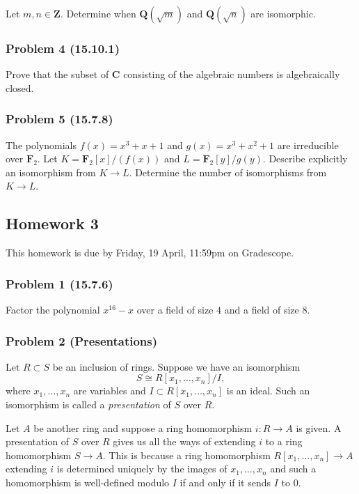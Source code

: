 \documentclass[11pt]{article}
\begin{document}
\bigskip

Let \(m, n \in \mathbf{Z}\).
Determine when \(\mathbf{Q}(\sqrt m)\) and \(\mathbf{Q}(\sqrt n)\) are isomorphic.
\subsubsection{Problem 4 (15.10.1)}
\label{sec:orgb454768}

Prove that the subset of \(\mathbf{C}\) consisting of the algebraic numbers is algebraically closed.
\subsubsection{Problem 5 (15.7.8)}
\label{sec:org962ef5e}

The polynomials \(f(x) = x^3 + x + 1\) and \(g(x) = x^3 + x^2 + 1\) are irreducible over \(\mathbf{F}_2\).
Let \(K = \mathbf{F}_2[x]/(f(x))\) and \(L = \mathbf{F}_2[y]/g(y)\).
Describe explicitly an isomorphism from \(K \to L\).
Determine the number of isomorphisms from \(K \to L\).
\subsection{Homework 3}
\label{sec:orgf5921ab}
This homework is due by Friday, 19 April, 11:59pm on Gradescope.
\subsubsection{Problem 1 (15.7.6)}
\label{sec:org82d0910}

Factor the polynomial \(x^{16}-x\) over a field of size \(4\) and a field of size \(8\).
\subsubsection{Problem 2 (Presentations)}
\label{sec:org529d139}

Let \(R \subset S\) be an inclusion of rings.
Suppose we have an isomorphism
\[ S \cong R[x_1, \dots, x_n]/I, \]
where \(x_1, \dots, x_n\) are variables and \(I \subset R[x_1, \dots, x_n]\) is an ideal.
Such an isomorphism is called a \emph{presentation} of \(S\) over \(R\).

Let \(A\) be another ring and suppose a ring homomorphism \(i \colon R \to A\) is given.
A presentation of \(S\) over \(R\) gives us all the ways of extending \(i\) to a ring homomorphism \(S \to A\).
This is because a ring homomorphism \(R[x_1,\dots,x_n] \to A\) extending \(i\) is determined uniquely by the images of \(x_1, \dots, x_n\) and such a homomorphism is well-defined modulo \(I\) if and only if it sends \(I\) to \(0\).
\end{document}

